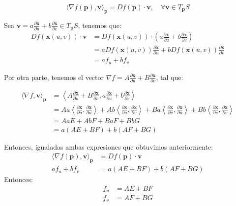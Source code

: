 \begin{problema}
\begin{dem}
\begin{cajita}
$$
\langle\nabla f(\mathbf{p}), \mathbf{v}\rangle_{\mathbf{p}}=D f(\mathbf{p}) \cdot \mathbf{v}, \quad \forall \mathbf{v} \in T_{\mathbf{p}} S
$$
\end{cajita}


Sea $\mathbf{v} = a\frac{\partial\mathbf{x}}{\partial u} + b\frac{\partial\mathbf{x}}{\partial v} \in T_{\mathbf{p}}S$, tenemos que:
\begin{align*}
    Df(\mathbf{x}(u,v))\cdot\mathbf{v} &= Df(\mathbf{x}(u,v))\cdot\left(a\frac{\partial\mathbf{x}}{\partial u} + b\frac{\partial\mathbf{x}}{\partial v}\right)\\
    &= aDf(\mathbf{x}(u,v))\frac{\partial\mathbf{x}}{\partial u} + bDf(\mathbf{x}(u,v))\frac{\partial\mathbf{x}}{\partial v}\\
    &= af_u + bf_v 
\end{align*}



Por otra parte, tenemos el vector $\nabla f = A\frac{\partial\mathbf{x}}{\partial u} + B\frac{\partial\mathbf{x}}{\partial v}$, tal que:

\begin{align*}
    \langle\nabla f,\mathbf{v}\rangle_{\mathbf{p}} &= \left\langle A\frac{\partial\mathbf{x}}{\partial u} + B\frac{\partial\mathbf{x}}{\partial v},a\frac{\partial\mathbf{x}}{\partial u} + b\frac{\partial\mathbf{x}}{\partial v}\right\rangle\\
    &=Aa\left\langle\frac{\partial\mathbf{x}}{\partial u},\frac{\partial\mathbf{x}}{\partial u}\right\rangle
    +Ab\left\langle\frac{\partial\mathbf{x}}{\partial u},\frac{\partial\mathbf{x}}{\partial v}\right\rangle
    +Ba\left\langle\frac{\partial\mathbf{x}}{\partial v},\frac{\partial\mathbf{x}}{\partial u}\right\rangle
    + Bb\left\langle\frac{\partial\mathbf{x}}{\partial v},\frac{\partial\mathbf{x}}{\partial v}\right\rangle \\
    &=AaE+AbF+BaF+ BbG\\
    &= a(AE+ BF)+b(AF+BG)
\end{align*}

Entonces, igualadas ambas expresiones que obtuvimos anteriormente: 
\begin{align*}
\langle\nabla f(\mathbf{p}), \mathbf{v}\rangle_{\mathbf{p}}&=D f(\mathbf{p}) \cdot \mathbf{v}\\
af_u + bf_v &= a(AE+ BF)+b(AF+BG)
\end{align*}
Entonces: 
\begin{align*}
    f_u &= AE+BF\\
    f_v &= AF+BG
\end{align*}


\end{dem}
\end{problema}
